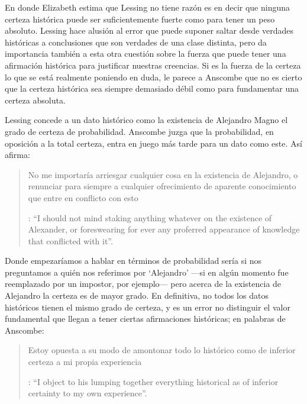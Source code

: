 En donde Elizabeth estima que Lessing no tiene razón es en decir que ninguna certeza histórica puede ser suficientemente fuerte como para tener un peso absoluto. Lessing hace alusión al error que puede suponer saltar desde verdades históricas a conclusiones que son verdades de una clase distinta, pero da importancia también a esta otra cuestión sobre la fuerza que puede tener una afirmación histórica para justificar nuestras creencias. Si es la fuerza de la certeza lo que se está realmente poniendo en duda, le parece a Anscombe que no es cierto que la certeza histórica sea siempre demasiado débil como para fundamentar una certeza absoluta.

Lessing concede a un dato histórico como la existencia de Alejandro Magno el grado de certeza de probabilidad. Anscombe juzga que la probabilidad, en oposición a la total certeza, entra en juego más tarde para un dato como este. Así afirma: \blockquote[{\Cite[26]{anscombe2008faith:prophandmi}}: \enquote{I should not mind staking anything whatever on the existence of Alexander, or foreswearing for ever any proferred appearance of knowledge that conflicted with it}.]{No me importaría arriesgar cualquier cosa en la existencia de Alejandro, o renunciar para siempre a cualquier ofrecimiento de aparente conocimiento que entre en conflicto con esto}. Donde empezaríamos a hablar en términos de probabilidad sería si nos preguntamos a quién nos referimos por `Alejandro' ---si en algún momento fue reemplazado por un impostor, por ejemplo--- pero acerca de la existencia de Alejandro la certeza es de mayor grado. En definitiva, no todos los datos históricos tienen el mismo grado de certeza, y es un error no distinguir el valor fundamental que llegan a tener ciertas afirmaciones históricas; en palabras de Anscombe: \blockquote[{\Cite[27]{anscombe2008faith:prophandmi}}: \enquote{I object to his lumping together everything historical as of inferior certainty to my own experience}.]{Estoy opuesta a su modo de amontonar todo lo histórico como de inferior certeza a mi propia experiencia}.

